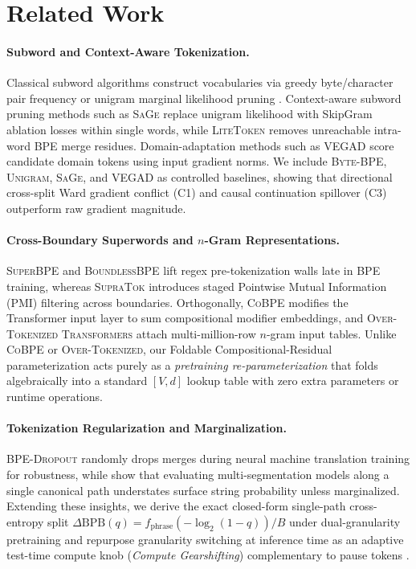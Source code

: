 \documentclass[11pt,a4paper]{article}
\begin{document}
\section{Related Work}
\label{sec:related}
\paragraph{Subword and Context-Aware Tokenization.}
Classical subword algorithms construct vocabularies via greedy byte/character pair frequency \citep{sennrich2016neural} or unigram marginal likelihood pruning \citep{kudo2018subword}. Context-aware subword pruning methods such as \textsc{SaGe} \citep{yehezkel2023incorporating} replace unigram likelihood with SkipGram ablation losses within single words, while \textsc{LiteToken} \citep{yang2026litetoken} removes unreachable intra-word BPE merge residues. Domain-adaptation methods such as \textsc{VEGAD} \citep{liu2024gold} score candidate domain tokens using input gradient norms. We include \textsc{Byte-BPE}, \textsc{Unigram}, \textsc{SaGe}, and \textsc{VEGAD} as controlled baselines, showing that directional cross-split Ward gradient conflict (\textsc{C1}) and causal continuation spillover (\textsc{C3}) outperform raw gradient magnitude.

\paragraph{Cross-Boundary Superwords and $n$-Gram Representations.}
\textsc{SuperBPE} \citep{liu2025superbpe} and \textsc{BoundlessBPE} \citep{schmidt2025boundless} lift regex pre-tokenization walls late in BPE training, whereas \textsc{SupraTok} \citep{tanase2026supratok} introduces staged Pointwise Mutual Information (PMI) filtering across boundaries. Orthogonally, \textsc{CoBPE} \citep{reif2025cobpe} modifies the Transformer input layer to sum compositional modifier embeddings, and \textsc{Over-Tokenized Transformers} \citep{huang2025overtokenized} attach multi-million-row $n$-gram input tables. Unlike \textsc{CoBPE} or \textsc{Over-Tokenized}, our Foldable Compositional-Residual parameterization acts purely as a \emph{pretraining re-parameterization} that folds algebraically into a standard $[V, d]$ lookup table with zero extra parameters or runtime operations.

\paragraph{Tokenization Regularization and Marginalization.}
\textsc{BPE-Dropout} \citep{provilkov2020bpe} randomly drops merges during neural machine translation training for robustness, while \citet{cao2021bench} show that evaluating multi-segmentation models along a single canonical path understates surface string probability unless marginalized. Extending these insights, we derive the exact closed-form single-path cross-entropy split $\Delta\text{BPB}(q) = f_{\text{phrase}}(-\log_2(1-q))/B$ under dual-granularity pretraining and repurpose granularity switching at inference time as an adaptive test-time compute knob (\emph{Compute Gearshifting}) complementary to pause tokens \citep{goyal2024think}.
\end{document}
